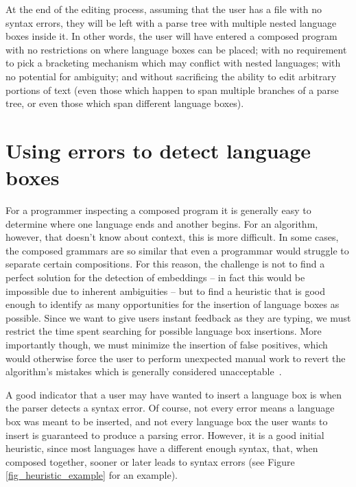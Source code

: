 \documentclass[sigplan,screen]{acmart}\settopmatter{printfolios=true,printccs=false,printacmref=false}
\begin{document}
At the end of the editing process, assuming that the user has a file with no syntax
errors, they will be left with a parse tree with multiple nested language boxes inside
it. In other words, the user will have entered a
composed program with no restrictions on where language boxes can be placed; with no
requirement to pick a bracketing mechanism which may conflict with nested
languages; with no potential for ambiguity; and without sacrificing the ability
to edit arbitrary portions of text (even those which happen to span multiple
branches of a parse tree, or even those which span different language boxes).

\section{Using errors to detect language boxes}
\label{sec_finding_lbox_candidates}

For a programmer inspecting a composed program it is generally easy
to determine where one language ends and another begins.
For an algorithm, however, that doesn't know about context, this is more difficult.
In some cases, the composed grammars are so similar that even a programmar would
struggle to separate certain compositions.
For this reason, the challenge is not to find a perfect solution for the detection
of embeddings -- in fact this would be impossible due to inherent ambiguities -- but
to find a heuristic that is good enough to identify as many
opportunities for the insertion of language boxes as possible.
Since we want to give users instant feedback as they are typing, we must restrict
the time spent searching for possible language box insertions.
More importantly though, we
must minimize the insertion of false positives, which would otherwise force the
user to perform unexpected manual work to revert the algorithm's mistakes which
is generally considered
unacceptable~\cite{vanter00displaying,lewis95designing,vanter94practical}.

A good indicator that a user may have wanted to insert a language box is when
the parser detects a syntax error. Of course, not every error means a
language box was meant to be inserted, and not every language box the user
wants to insert is guaranteed to produce a parsing error. However, it is a good
initial heuristic, since most languages have a different enough syntax, that, when
composed together, sooner or later leads to
syntax errors (see Figure \ref{fig_heuristic_example}
for an example).
\end{document}
